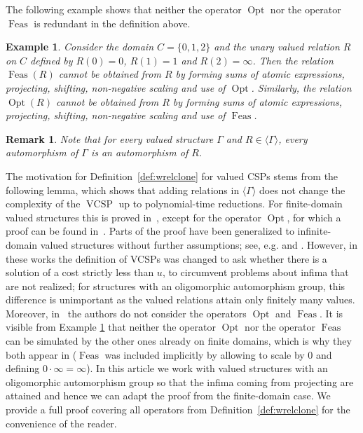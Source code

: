 \documentclass[nonacm]{acmart}
\DeclareMathOperator{\VCSP}{VCSP}
\DeclareMathOperator{\Opt}{Opt}
\DeclareMathOperator{\Feas}{Feas}
\newtheorem{expl}[theorem]{Example}
\newtheorem{remark}[theorem]{Remark}
\begin{document}
The following example shows that neither the operator $\Opt$ nor the operator $\Feas$ is redundant in the definition above.

\begin{expl}\label{expl:opt-feas}
Consider the domain $C=\{0,1,2\}$ and the unary valued relation $R$ on $C$ defined by $R(0)=0$, $R(1)=1$ and $R(2)=\infty$. Then the relation $\Feas(R)$ cannot be obtained from $R$ by forming sums of atomic expressions, projecting, shifting, non-negative scaling and use of $\Opt$. Similarly, the relation $\Opt(R)$ cannot be obtained from $R$ by forming sums of atomic expressions, projecting, shifting, non-negative scaling and use of $\Feas$. 
\end{expl}

\begin{remark}\label{rem:aut}
Note that for every valued structure $\Gamma$ and $R\in \langle \Gamma \rangle$, every automorphism of $\Gamma$ is an automorphism of $R$. 
\end{remark}


The motivation for Definition~\ref{def:wrelclone} for valued CSPs stems from the following lemma, which shows that adding relations in $\langle\Gamma \rangle$ does not change the complexity of the $\VCSP$ up to polynomial-time reductions. For finite-domain valued structures this is proved  in~\cite{VCSP-Galois}, 
except for the operator $\Opt$, for which a proof can be found in~\cite[Theorem 5.13]{FullaZivny}. Parts of the proof have been generalized to infinite-domain valued structures without further assumptions; see, e.g. \cite{SchneiderViola} and \cite[Lemma 7.1.4]{ViolaThesis}. However, in these works the definition of VCSPs was changed to ask whether there is a solution of a cost strictly less than $u$, to circumvent problems about infima that are not realized; for structures with an oligomorphic automorphism group, this difference is unimportant as the valued relations attain only finitely many values.
Moreover,
in~\cite{SchneiderViola,ViolaThesis} the authors 
do not consider the operators $\Opt$ and $\Feas$. 
It is visible from Example \ref{expl:opt-feas} that neither the operator $\Opt$ nor the operator $\Feas$ can be simulated by the other ones already on finite domains, which is why they both appear in \cite{FullaZivny} ($\Feas$ was included implicitly by allowing to scale by $0$ and defining $0 \cdot \infty=\infty$). In this article we work with valued structures with an oligomorphic automorphism group so that the infima coming from projecting 
are attained and hence
we can adapt the proof from the finite-domain case.
We provide a full proof covering all operators from Definition~\ref{def:wrelclone} for the convenience of the reader.
\end{document}
